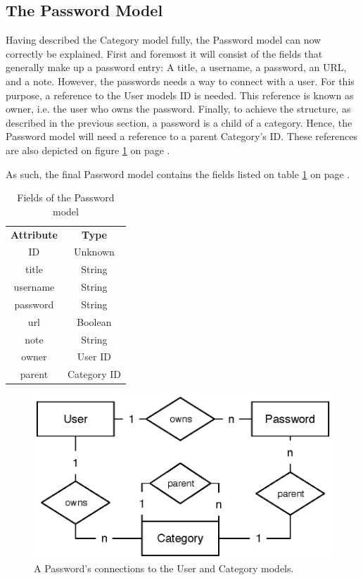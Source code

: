 		\subsection{The Password Model}
			\label{sec:model:model}
			Having described the Category model fully, the Password model can now correctly be explained. First and foremost it will consist of the fields that generally make up a password entry: A title, a username, a password, an URL, and a note. However, the passwords needs a way to connect with a user. For this purpose, a reference to the User models ID is needed. This reference is known as owner, i.e. the user who owns the password. Finally, to achieve the structure, as described in the previous section, a password is a child of a category. Hence, the Password model will need a reference to a parent Category's ID. These references are also depicted on figure \ref{fig:relationship:password} on page \pageref{fig:relationship:password}.

			As such, the final Password model contains the fields listed on table \ref{fig:model:password} on page \pageref{fig:model:password}.

			\begin{table}[p]
				\centering
				\begin{tabular}{c|c}
					\textbf{Attribute} 		& \textbf{Type} 	\\
					ID 						& Unknown 			\\
					title 					& String 			\\
					username 				& String 			\\
					password 				& String 			\\
					url						& Boolean 			\\
					note  					& String 			\\
					owner 					& User ID 			\\
					parent 					& Category ID 		\\
				\end{tabular}
				\caption{Fields of the Password model}
				\label{fig:model:password}
			\end{table}
			
			\begin{figure}[p]
				\centering
				\includegraphics[scale=0.75]{figures/design/uml/user-password-category-erd.eps}
				\caption{A Password's connections to the User and Category models.}
				\label{fig:relationship:password}
			\end{figure}

